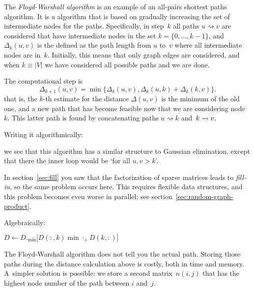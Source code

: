 The \emph{Floyd-Warshall algorithm} is an example of an all-pairs
shortest paths algorithm. It is a 
algorithm that is based on gradually increasing the set of intermediate
nodes for the paths.
Specifically,  in step~$k$ all paths $u\rightsquigarrow v$ are considered 
that have intermediate nodes in the set $k=\{0,\ldots,k-1\}$, and $\Delta_k(u,v)$ 
is the defined as the path length from $u$ to~$v$ where all intermediate nodes
are in~$k$. Initially, this means that only graph edges are considered, and
when $k\equiv |V|$ we have considered all possible paths and we are done.

The computational step is
\begin{equation}
  \Delta_{k+1}(u,v) = \min\bigl\{ \Delta_k(u,v),
  \Delta_k(u,k)+\Delta_k(k,v) \bigr\}.
  \label{eq:floyd-allpairs}
\end{equation}
that is, the $k$-th estimate for the distance $\Delta(u,v)$ is the minimum
of the old one, and a new path that has become feasible now that we
are considering node~$k$. This latter path is found by
concatenating paths $u\rightsquigarrow k$
and~$k\rightsquigarrow\nobreak v$.

Writing it algorithmically:
\begin{displayalgorithm}
\end{displayalgorithm}
we see that this algorithm has a similar structure to Gaussian elimination, 
except that there the inner loop would be `for all $u,v>k$'.

In section~\ref{sec:fill} you saw that the factorization of sparse
matrices leads to \emph{fill-in},
so the same problem occurs here. This requires flexible data structures,
and this problem becomes even worse in parallel; see section~\ref{sec:random-graph-product}.

Algebraically:
\begin{displayalgorithm}
   {
    $D\leftarrow D._{\min} \bigl[D(:,k) \mathbin{\min\cdot_+} D(k,:)  \bigr]$
  }
\end{displayalgorithm}

The Floyd-Warshall algorithm does not tell you the actual
path. Storing those paths during the distance calculation above is
costly, both in time and memory. A~simpler solution is possible: we
store a second matrix~$n(i,j)$ that has the highest node number of the
path between $i$ and~$j$.

